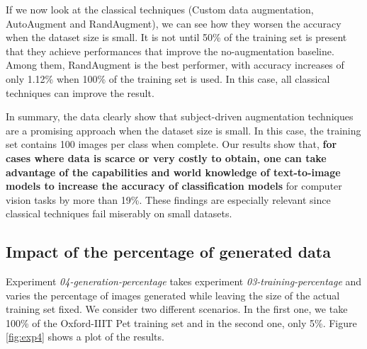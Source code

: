 If we now look at the classical techniques (Custom data augmentation, AutoAugment and RandAugment), we can see how they worsen the accuracy when the dataset size is small. It is not until 50\% of the training set is present that they achieve performances that improve the no-augmentation baseline. Among them, RandAugment is the best performer, with accuracy increases of only 1.12\% when 100\% of the training set is used. In this case, all classical techniques can improve the result.

In summary, the data clearly show that subject-driven augmentation techniques are a promising approach when the dataset size is small. In this case, the training set contains 100 images per class when complete. Our results show that, \textbf{for cases where data is scarce or very costly to obtain, one can take advantage of the capabilities and world knowledge of text-to-image models to increase the accuracy of classification models} for computer vision tasks by more than 19\%. These findings are especially relevant since classical techniques fail miserably on small datasets.

\subsection{Impact of the percentage of generated data} \label{sec: exp-04}

Experiment \textit{04-generation-percentage} takes experiment \textit{03-training-percentage} and varies the percentage of images generated while leaving the size of the actual training set fixed. We consider two different scenarios. In the first one, we take 100\% of the Oxford-IIIT Pet training set and in the second one, only 5\%. Figure \ref{fig:exp4} shows a plot of the results. 

